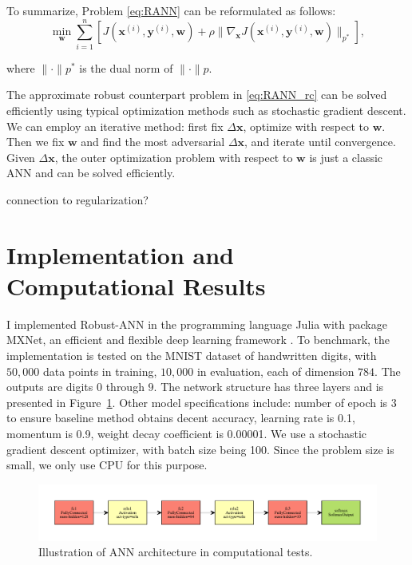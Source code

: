 \documentclass[twoside,12pt]{article}
\newcommand{\M}[1]{\boldsymbol{\mathbf{#1}}}
\begin{document}
To summarize, Problem \eqref{eq:RANN} can be reformulated as follows:
\begin{equation}\label{eq:RANN_rc}
\min_{\M w} \sum_{i=1}^n \left[J(\M x^{(i)}, \M y^{(i)}, \M w) + \rho \| \nabla_{\M x} J(\M x^{(i)}, \M y^{(i)}, \M w) \|_{p^*}\right],
\end{equation}

where $\|\cdot \|p^*$ is the dual norm of $\|\cdot \|p$.

The approximate robust counterpart problem in \eqref{eq:RANN_rc} can be solved efficiently using typical optimization methods such as stochastic gradient descent. 
We can employ an iterative method: first fix $\Delta \M x$, optimize with respect to $\M w$. Then we fix $\M w$ and find the most adversarial $\Delta \M x$, and iterate until convergence. Given $\Delta \M x$, the outer optimization problem with respect to $\M w$ is just a classic ANN and can be solved efficiently. 




connection to regularization?

\section{Implementation and Computational Results}
I implemented Robust-ANN in the programming language \textsf{Julia} with package \textsf{MXNet}, an efficient and flexible deep learning framework \cite{mxnet}. To benchmark, the implementation is tested on the MNIST dataset of handwritten digits, with $50,000$ data points in training, $10,000$ in evaluation, each of dimension $784$. The outputs are digits $0$ through $9$. The network structure has three layers and is presented in Figure~\ref{fig:ann_arc}. Other model specifications include: number of epoch is 3 to ensure baseline method obtains decent accuracy, learning rate is 0.1, momentum is 0.9, weight decay coefficient is 0.00001. We use a stochastic gradient descent optimizer, with batch size being 100. Since the problem size is small, we only use CPU for this purpose. 
\begin{figure}[ht!]
    \includegraphics[scale=0.7]{visualize.pdf}
    \caption{Illustration of ANN architecture in computational tests.}
    \label{fig:ann_arc}
\end{figure}
\end{document}
